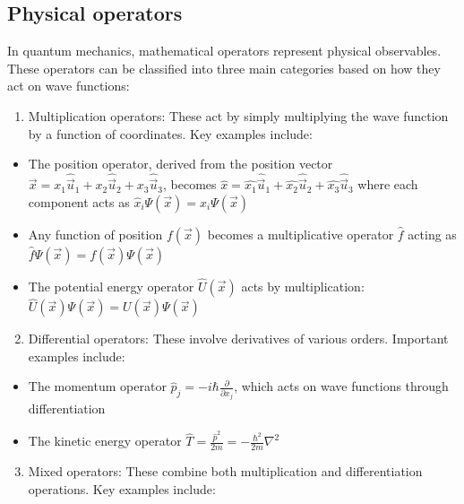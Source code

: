 \subsection{Physical operators}
In quantum mechanics, mathematical operators represent physical observables. These operators can be classified into three main categories based on how they act on wave functions:

\begin{enumerate}
  \item Multiplication operators: These act by simply multiplying the wave function by a function of coordinates. Key examples include:
\end{enumerate}

\begin{itemize}
  \item The position operator, derived from the position vector $\vec{x}=x_{1} \hat{\vec{u}}_{1}+x_{2} \hat{\vec{u}}_{2}+x_{3} \hat{\vec{u}}_{3}$, becomes $\hat{x}=\hat{x_{1}} \hat{\vec{u}}_{1}+\hat{x_{2}} \hat{\vec{u}}_{2}+\hat{x_{3}} \hat{\vec{u}}_{3}$ where each component acts as $\hat{x}_i\Psi(\vec{x}) = x_i\Psi(\vec{x})$
  \item Any function of position $f(\vec{x})$ becomes a multiplicative operator $\hat{f}$ acting as $\hat{f}\Psi(\vec{x}) = f(\vec{x})\Psi(\vec{x})$
  \item The potential energy operator $\hat{U}(\vec{x})$ acts by multiplication: $\hat{U}(\vec{x})\Psi(\vec{x}) = U(\vec{x})\Psi(\vec{x})$
\end{itemize}

\begin{enumerate}
  \setcounter{enumi}{1}
  \item Differential operators: These involve derivatives of various orders. Important examples include:
\end{enumerate}

\begin{itemize}
  \item The momentum operator $\hat{p}_{j}=-i \hbar \frac{\partial}{\partial x_{j}}$, which acts on wave functions through differentiation
  \item The kinetic energy operator $\hat{T} = \frac{\hat{p}^2}{2m} = -\frac{\hbar^2}{2m}\nabla^2$
\end{itemize}


\begin{enumerate}
  \setcounter{enumi}{2}
  \item Mixed operators: These combine both multiplication and differentiation operations. Key examples include:
\end{enumerate}

